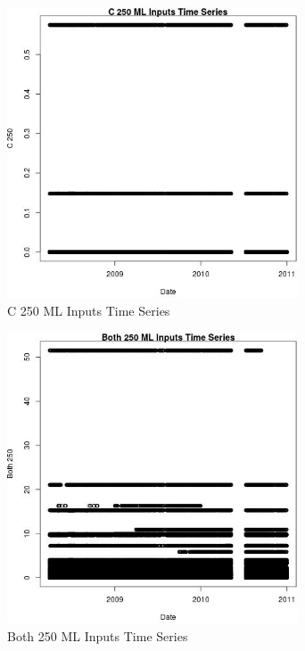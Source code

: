 \begin{figure} 
\centering  
\includegraphics[width=0.77\textwidth]{Code_Outputs/ML_input_report_ML_input_PM25_Step5_part_d_de_duplicated_aves_ML_input_C_250vDate.jpg} 
\caption{\label{fig:ML_input_report_ML_input_PM25_Step5_part_d_de_duplicated_aves_ML_inputC_250vDate}C 250 ML Inputs Time Series} 
\end{figure} 
 

\begin{figure} 
\centering  
\includegraphics[width=0.77\textwidth]{Code_Outputs/ML_input_report_ML_input_PM25_Step5_part_d_de_duplicated_aves_ML_input_Both_250vDate.jpg} 
\caption{\label{fig:ML_input_report_ML_input_PM25_Step5_part_d_de_duplicated_aves_ML_inputBoth_250vDate}Both 250 ML Inputs Time Series} 
\end{figure} 
 

